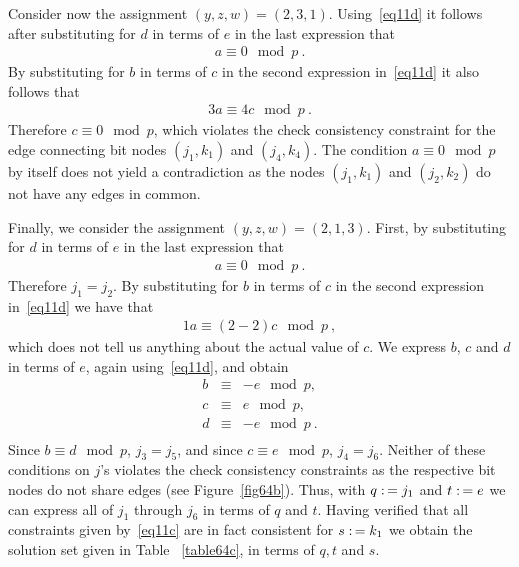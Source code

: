 Consider now the assignment $(y,z,w)=(2,3,1)$. Using~\eqref{eq11d}
it follows after substituting for $d$ in terms of $e$ in the last
expression that
\begin{eqnarray}
a \equiv 0 \mod p~.
\end{eqnarray}
By substituting for $b$ in terms of $c$ in the second expression
in~\eqref{eq11d} it also follows that
\begin{eqnarray}
3a \equiv 4c \mod p~.
\end{eqnarray}
Therefore $c \equiv 0 \mod p$, which violates the check consistency
constraint for the edge connecting bit nodes $(j_1,k_1)$ and
$(j_4,k_4)$. The condition $a \equiv 0 \mod p$ by itself does not
yield a contradiction as the nodes $(j_1,k_1)$ and $(j_2,k_2)$ do
not have any edges in common.

Finally, we consider the assignment $(y,z,w)=(2,1,3)$. First, by
substituting for $d$ in terms of $e$ in the last expression that
\begin{eqnarray}
a \equiv 0 \mod p~.
\end{eqnarray}
Therefore $j_1=j_2$. By substituting for $b$ in terms of $c$ in
the second expression in~\eqref{eq11d} we have that
\begin{eqnarray}
1a \equiv (2-2)c \mod p~,
\end{eqnarray}
which does not tell us anything about the actual value of $c$. We
express $b$, $c$ and $d$ in terms of $e$, again
using~\eqref{eq11d}, and obtain
\begin{equation}\label{eq11g}\begin{array}{cccc}
b &\equiv & -e \mod p, \\
c &\equiv & e \mod p, \\
d &\equiv & -e \mod p~. \\
\end{array}\end{equation}
Since $b \equiv d \mod p$, $j_3=j_5$, and since $c \equiv e \mod p$,
$j_4=j_6$. Neither of these conditions on $j$'s violates the check
consistency constraints as the respective bit nodes do not share
edges (see Figure~\ref{fig64b}). Thus, with $q \asn j_1$ and $t \asn
e$ we can express all of $j_1$ through $j_6$ in terms of $q$ and
$t$. Having verified that all constraints given by~\eqref{eq11c} are
in fact consistent for $s \asn k_1$ we obtain the solution set given
in Table ~\ref{table64c}, in terms of $q,t$ and $s$.

